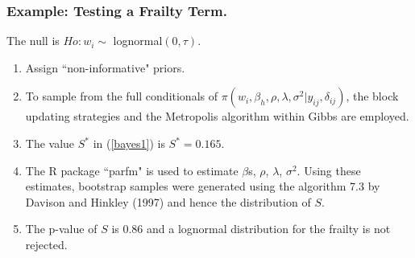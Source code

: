 \documentclass{beamer}
\begin{document}
 \frame
{
  \frametitle{Example: Testing a Frailty Term.}

The null is $Ho: w_i \sim$ lognormal$(0, \tau)$.
\begin{enumerate}
\item Assign 
``non-informative"
priors.

\item
To sample from the full conditionals of 
$\pi(w_i, \beta_h, \rho, \lambda, \sigma^2|y_{ij}, \delta_{ij})$, 
the block updating strategies 
 and
the Metropolis algorithm within Gibbs are employed.  
 \item
The value $S^*$ in (\ref{bayes1}) is 
$S^*= 0.165$.
\item
The R package ``parfm" is used to 
estimate $\beta$s, $\rho$, $\lambda$, $\sigma^2$. 
Using these
estimates, bootstrap samples 
were generated using the 
algorithm 7.3 by Davison 
and Hinkley (1997) and hence the distribution of $S$.
\item
The p-value of $S$ is 
 0.86 and a lognormal distribution
 for the frailty is not rejected. 
 \end{enumerate}
 }
  
\end{document}
